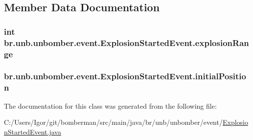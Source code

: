 \subsection{Member Data Documentation}
\hypertarget{classbr_1_1unb_1_1unbomber_1_1event_1_1_explosion_started_event_a49b514669cac258aa4fbf1d8f5147c9e}{
\subsubsection[{explosion\+Range}]{\setlength{\rightskip}{0pt plus 5cm}int br.\+unb.\+unbomber.\+event.\+Explosion\+Started\+Event.\+explosion\+Range\hspace{0.3cm}{\ttfamily [private]}}}\label{classbr_1_1unb_1_1unbomber_1_1event_1_1_explosion_started_event_a49b514669cac258aa4fbf1d8f5147c9e}
\hypertarget{classbr_1_1unb_1_1unbomber_1_1event_1_1_explosion_started_event_abfef22edb8b12f9a74b7de602026a513}{
\subsubsection[{initial\+Position}]{ br.\+unb.\+unbomber.\+event.\+Explosion\+Started\+Event.\+initial\+Position\hspace{0.3cm}{\ttfamily [private]}}}\label{classbr_1_1unb_1_1unbomber_1_1event_1_1_explosion_started_event_abfef22edb8b12f9a74b7de602026a513}


The documentation for this class was generated from the following file\+:\begin{DoxyCompactItemize}
\item 
C\+:/\+Users/\+Igor/git/bomberman/src/main/java/br/unb/unbomber/event/\hyperlink{_explosion_started_event_8java}{Explosion\+Started\+Event.\+java}\end{DoxyCompactItemize}
